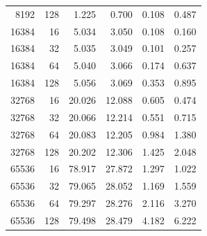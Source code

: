 \documentclass[11pt]{article}
\begin{document}
\begin{table}[H]
\begin{tabular}{rrrrrr}
8192 & 128 & 1.225 & 0.700 & 0.108 & 0.487 \\
16384 & 16 & 5.034 & 3.050 & 0.108 & 0.160 \\
16384 & 32 & 5.035 & 3.049 & 0.101 & 0.257 \\
16384 & 64 & 5.040 & 3.066 & 0.174 & 0.637 \\
16384 & 128 & 5.056 & 3.069 & 0.353 & 0.895 \\
32768 & 16 & 20.026 & 12.088 & 0.605 & 0.474 \\
32768 & 32 & 20.066 & 12.214 & 0.551 & 0.715 \\
32768 & 64 & 20.083 & 12.205 & 0.984 & 1.380 \\
32768 & 128 & 20.202 & 12.306 & 1.425 & 2.048 \\
65536 & 16 & 78.917 & 27.872 & 1.297 & 1.022 \\
65536 & 32 & 79.065 & 28.052 & 1.169 & 1.559 \\
65536 & 64 & 79.297 & 28.276 & 2.116 & 3.270 \\
65536 & 128 & 79.498 & 28.479 & 4.182 & 6.222 \\
\bottomrule
\end{tabular}
\end{table}
\end{document}
